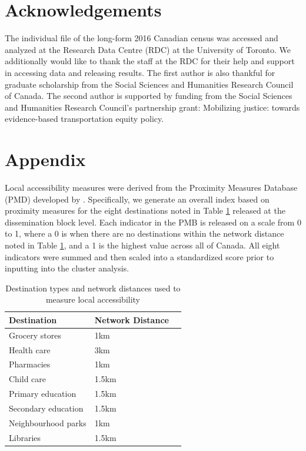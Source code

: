 \documentclass[10 pt,letterpaper]{article}
\renewcommand{\baselinestretch}{1.11}
\begin{document}
\section{Acknowledgements}

The individual file of the long-form 2016 Canadian census was accessed and analyzed at the Research Data Centre (RDC) at the University of Toronto. We additionally would like to thank the staff at the RDC for their help and support in accessing data and releasing results. The first author is also thankful for graduate scholarship from the Social Sciences and Humanities Research Council of Canada. The second author is supported by funding from the Social Sciences and Humanities Research Council’s partnership grant: Mobilizing justice: towards evidence-based transportation equity policy.




\section*{Appendix}

Local accessibility measures were derived from the Proximity Measures Database (PMD) developed by . Specifically, we generate an overall index based on proximity measures for the eight destinations noted in Table \ref{table:pmd} released at the dissemination block level. Each indicator in the PMB is released on a scale from 0 to 1, where a 0 is when there are no destinations within the network distance noted in Table \ref{table:pmd}, and a 1 is the highest value across all of Canada. All eight indicators were summed and then scaled into a standardized score prior to inputting into the cluster analysis.

\begin{table}[h]
	\small
	\centering
	\caption{{Destination types and network distances used to measure local accessibility}}
	\label{table:pmd}
	\begin{tabular}{lll}
		\hline
		\textbf{Destination}    & \textbf{Network Distance}   \\ \hline
		Grocery stores & 1km \\
		Health care & 3km \\
		Pharmacies & 1km \\
		Child care & 1.5km \\
		Primary education & 1.5km \\
		Secondary education & 1.5km \\
		Neighbourhood parks & 1km \\
		Libraries & 1.5km \\ 
		\hline
	\end{tabular}
\end{table}
	

\renewcommand{\baselinestretch}{1.1} 



\end{document}
